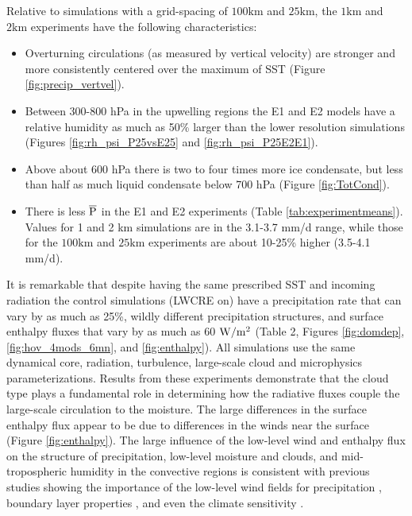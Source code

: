\documentclass[draft]{agujournal2019}
\begin{document}
{Relative to simulations with a grid-spacing of $100 \textrm{km}$ and $25 \textrm{km}$, the $1 \textrm{km}$ and 
$2 \textrm{km}$ experiments have the following characteristics: 
\begin{itemize}
  \item Overturning circulations (as measured by vertical velocity) are stronger and more consistently centered 
  over the maximum of SST (Figure \ref{fig:precip_vertvel}).  
  \item %
  Between 300-800 hPa in the upwelling regions the E1 and E2 %
  models have a relative humidity 
  as much as 50\% larger than the lower resolution simulations (Figures \ref{fig:rh_psi_P25vsE25} and \ref{fig:rh_psi_P25E2E1}).  
  \item Above about 600 hPa there is two to four times more ice condensate, but less than half as much liquid condensate below 700 hPa (Figure \ref{fig:TotCond}).
  \item There is less $\overline{\rm{P}}$ in the E1 and E2 experiments (Table \ref{tab:experimentmeans}).  Values for 1 and 2 km simulations are in the 3.1-3.7 mm/d range, while those 
  for the $100 \textrm{km}$ and $25 \textrm{km}$ experiments are about 10-25\% higher (3.5-4.1 mm/d).  
\end{itemize}

It is remarkable that despite having the same prescribed SST and incoming radiation
the control simulations (LWCRE on) have a precipitation rate  that can vary by as much as 
25\%, wildly different precipitation structures, and surface enthalpy fluxes that vary by as much as 
60 $\rm{W/m^2}$ (Table 2, Figures \ref{fig:domdep}, \ref{fig:hov_4mods_6mn}, and \ref{fig:enthalpy}).
All simulations use the same dynamical core, radiation, turbulence, large-scale cloud and microphysics parameterizations.  
Results from these experiments demonstrate that the cloud type
plays a fundamental role in determining how the radiative fluxes couple
the large-scale circulation to the moisture.  The large differences in the surface enthalpy flux
appear to be due to differences in the winds near the surface (Figure \ref{fig:enthalpy}).  
The large influence of the low-level wind  and enthalpy flux on the structure of precipitation, 
low-level moisture and clouds, and mid-tropospheric humidity in the convective regions is 
consistent with previous studies showing the importance of the low-level wind fields for precipitation 
\cite{Wofsy_Kuang_2012, Fermepin_Bony_2014}, boundary layer properties \cite{Raymond_1994}, and even the climate 
sensitivity \cite{Silvers_etal_2016}.  

}
\end{document}
